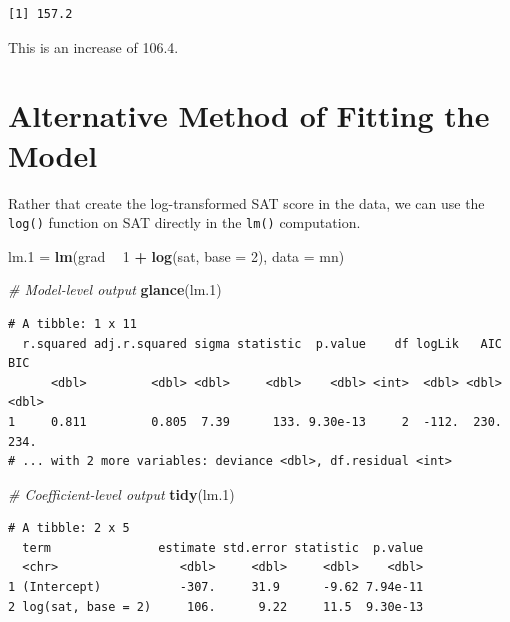 \documentclass[]{book}
\newenvironment{Shaded}{\begin{snugshade}}{\end{snugshade}}
\newcommand{\CommentTok}[1]{\textcolor[rgb]{0.56,0.35,0.01}{\textit{#1}}}
\newcommand{\DataTypeTok}[1]{\textcolor[rgb]{0.13,0.29,0.53}{#1}}
\newcommand{\DecValTok}[1]{\textcolor[rgb]{0.00,0.00,0.81}{#1}}
\newcommand{\FloatTok}[1]{\textcolor[rgb]{0.00,0.00,0.81}{#1}}
\newcommand{\KeywordTok}[1]{\textcolor[rgb]{0.13,0.29,0.53}{\textbf{#1}}}
\newcommand{\NormalTok}[1]{#1}
\newcommand{\OperatorTok}[1]{\textcolor[rgb]{0.81,0.36,0.00}{\textbf{#1}}}
\newcommand{\StringTok}[1]{\textcolor[rgb]{0.31,0.60,0.02}{#1}}
\begin{document}
\begin{verbatim}
[1] 157.2
\end{verbatim}

This is an increase of 106.4.

\hypertarget{alternative-method-of-fitting-the-model}{%
\section{Alternative Method of Fitting the Model}\label{alternative-method-of-fitting-the-model}}

Rather that create the log-transformed SAT score in the data, we can use the \texttt{log()} function on SAT directly in the \texttt{lm()} computation.

\begin{Shaded}
\begin{Highlighting}[]
\NormalTok{lm}\FloatTok{.1}\NormalTok{ =}\StringTok{ }\KeywordTok{lm}\NormalTok{(grad }\OperatorTok{~}\StringTok{ }\DecValTok{1} \OperatorTok{+}\StringTok{ }\KeywordTok{log}\NormalTok{(sat, }\DataTypeTok{base =} \DecValTok{2}\NormalTok{), }\DataTypeTok{data =}\NormalTok{ mn)}

\CommentTok{# Model-level output}
\KeywordTok{glance}\NormalTok{(lm}\FloatTok{.1}\NormalTok{)}
\end{Highlighting}
\end{Shaded}

\begin{verbatim}
# A tibble: 1 x 11
  r.squared adj.r.squared sigma statistic  p.value    df logLik   AIC   BIC
      <dbl>         <dbl> <dbl>     <dbl>    <dbl> <int>  <dbl> <dbl> <dbl>
1     0.811         0.805  7.39      133. 9.30e-13     2  -112.  230.  234.
# ... with 2 more variables: deviance <dbl>, df.residual <int>
\end{verbatim}

\begin{Shaded}
\begin{Highlighting}[]
\CommentTok{# Coefficient-level output}
\KeywordTok{tidy}\NormalTok{(lm}\FloatTok{.1}\NormalTok{)}
\end{Highlighting}
\end{Shaded}

\begin{verbatim}
# A tibble: 2 x 5
  term               estimate std.error statistic  p.value
  <chr>                 <dbl>     <dbl>     <dbl>    <dbl>
1 (Intercept)           -307.     31.9      -9.62 7.94e-11
2 log(sat, base = 2)     106.      9.22     11.5  9.30e-13
\end{verbatim}
\end{document}

